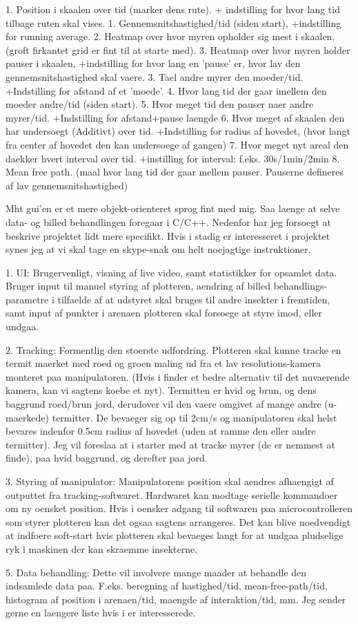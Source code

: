 1. Position i skaalen over tid (marker dens rute). + indstilling for hvor
lang tid tilbage ruten skal vises.
1. Gennemsnitshastighed/tid (siden start), +indstilling for running average.
2. Heatmap over hvor myren opholder sig mest i skaalen, (groft firkantet
grid er fint til at starte med).
3. Heatmap over hvor myren holder pauser i skaalen, +indstilling for hvor
lang en 'pause' er, hvor lav den gennemsnitshastighed skal vaere.
3. Tael andre myrer den moeder/tid. +Indstilling for afstand af et 'moede'.
4. Hvor lang tid der gaar imellem den moeder andre/tid (siden start).
5. Hvor meget tid den pauser naer andre myrer/tid. +Indstilling for
afstand+pause laengde
6. Hvor meget af skaalen den har undersoegt (Additivt) over tid.
+Indstilling for radius af hovedet, (hvor langt fra center af hovedet den
kan  undersoege af gangen)
7. Hvor meget nyt areal den daekker hvert interval over tid. +instilling
for interval: f.eks. 30s/1min/2min
8. Mean free path. (maal hvor lang tid der gaar mellem pauser. Pauserne
defineres af lav gennemsnitshastighed)

Mht gui'en er et mere objekt-orienteret sprog fint med mig. Saa laenge at
selve data- og billed behandlingen foregaar i C/C++.
Nedenfor har jeg forsoegt at beskrive projektet lidt mere specifikt. Hvis
i stadig er interesseret i projektet synes jeg at vi skal tage en
skype-snak om helt noejagtige instruktioner.

1. UI:
Brugervenligt, visning af live video, samt statistikker for opsamlet data.
Bruger input til manuel styring af plotteren, aendring af billed
behandlings-parametre i tilfaelde af at udstyret skal bruges til andre
insekter i fremtiden, samt input af punkter i arenaen plotteren skal
forsoege at styre imod, eller undgaa.

2. Tracking:
Formentlig den stoerste udfordring. Plotteren skal kunne tracke en termit
maerket med roed og groen maling ud fra et lav resolutions-kamera monteret
paa manipulatoren. (Hvis i finder et bedre alternativ til det nuvaerende
kamera, kan vi sagtens koebe et nyt). Termitten er hvid og brun, og dens
baggrund roed/brun jord, derudover vil den vaere omgivet af mange andre
(u-maerkede) termitter. De bevaeger sig op til 2cm/s og manipulatoren skal
helst bevares indenfor 0.5cm radius af hovedet (uden at ramme den eller
andre termitter).
Jeg vil foreslaa at i starter med at tracke myrer (de er nemmest at
finde), paa hvid baggrund, og derefter paa jord.

3. Styring af manipulator:
Manipulatorens position skal aendres afhaengigt af outputtet fra
tracking-softwaret. Hardwaret kan modtage serielle kommandoer om ny
oensket position. Hvis i oensker adgang til softwaren paa
microcontrolleren som styrer plotteren kan det ogsaa sagtens arrangeres.
Det kan blive noedvendigt at indfoere soft-start hvis plotteren skal
bevaeges langt for at undgaa pludselige ryk i maskinen der kan skraemme
insekterne.

5. Data behandling: Dette vil involvere mange maader at behandle den
indsamlede data paa. F.eks. beregning af hastighed/tid,
mean-free-path/tid, histogram af position i arenaen/tid, maengde af
interaktion/tid, mm. Jeg sender gerne en laengere liste hvis i er
interesserede.

